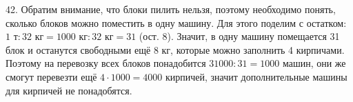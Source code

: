 42. Обратим внимание, что блоки пилить нельзя, поэтому необходимо понять, сколько блоков можно поместить в одну машину. Для этого поделим с остатком:
$1\text{ т}:32\text{ кг}=1000\text{ кг}:32\text{ кг}=31$ (ост. 8). Значит, в одну машину помещается 31 блок и останутся свободными ещё 8 кг, которые можно заполнить 4 кирпичами. Поэтому на перевозку всех блоков понадобится $31000:31=1000$ машин, они же смогут перевезти ещё $4\cdot1000=4000$ кирпичей, значит дополнительные машины для кирпичей не понадобятся.\\
